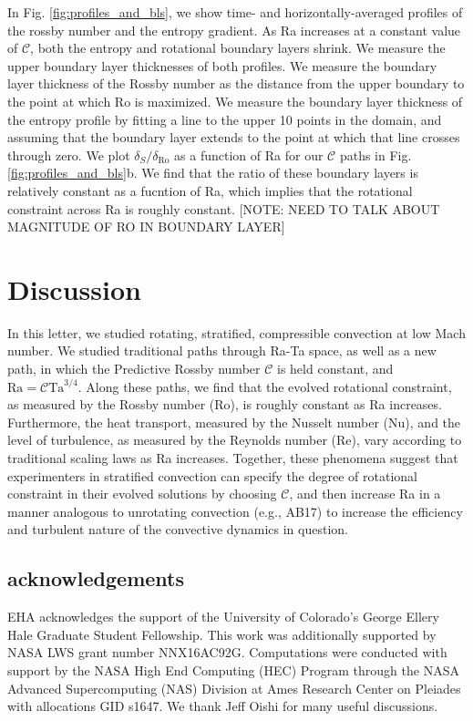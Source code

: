 \documentclass[twocolumn, amsmath, amsfonts, amssymb]{aastex62}
\begin{document}
In Fig. \ref{fig:profiles_and_bls}, we show time- and horizontally-averaged profiles of
the rossby number and the entropy gradient. As Ra increases at a constant value of
$\mathcal{C}$, both the entropy and rotational boundary layers shrink. We measure the
upper boundary layer thicknesses of both profiles. We measure the boundary layer thickness
of the Rossby number as the distance from the upper boundary to the point at which Ro
is maximized. We measure the boundary layer thickness of the entropy profile by fitting
a line to the upper 10 points in the domain, and assuming that the boundary layer extends to
the point at which that line crosses through zero. We plot $\delta_S/\delta_{\text{Ro}}$
as a function of Ra for our $\mathcal{C}$ paths in Fig. \ref{fig:profiles_and_bls}b. We find
that the ratio of these boundary layers is relatively constant as a fucntion of Ra, which
implies that the rotational constraint across Ra is roughly constant.
[NOTE: NEED TO TALK ABOUT MAGNITUDE OF RO IN BOUNDARY LAYER]

\section{Discussion}
\label{section:discussion}
In this letter, we studied rotating, stratified, compressible convection at low Mach 
number. We studied traditional paths through Ra-Ta space, as well as a new path,
in which the Predictive Rossby number $\mathcal{C}$ is held constant, and
$\text{Ra} = \mathcal{C} \text{Ta}^{3/4}$. Along these paths, we find that the evolved
rotational constraint, as measured by the Rossby number (Ro), is roughly constant as
Ra increases. Furthermore, the heat transport, measured by the Nusselt number (Nu), and the
level of turbulence, as measured by the Reynolds number (Re), vary according to traditional 
scaling laws as Ra increases. Together, these phenomena suggest that experimenters in
stratified convection can specify the degree of rotational constraint in their evolved
solutions by choosing $\mathcal{C}$, and then increase Ra in a manner analogous to 
unrotating convection (e.g., AB17) to increase the efficiency and turbulent nature of the
convective dynamics in question.







\subsection{acknowledgements}
EHA acknowledges the support of the University of Colorado's George 
Ellery Hale Graduate Student Fellowship.
This work was additionally supported by  NASA LWS grant number NNX16AC92G.  
Computations were conducted 
with support by the NASA High End Computing (HEC) Program through the NASA 
Advanced Supercomputing (NAS) Division at Ames Research Center on Pleiades
with allocations GID s1647.
We thank  Jeff Oishi for many useful discussions. 


\end{document}
